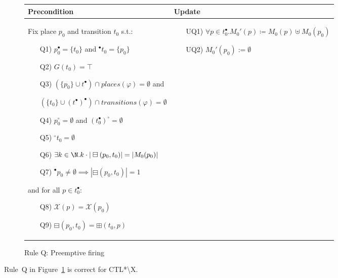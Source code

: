 \begin{figure}[h!]
    \vspace{5mm}

    \begin{adjustbox}{center}
        \begin{tabular}{|p{65mm}|p{60mm}|}
            \hline
            Precondition & Update \\ \hline
            Fix place $p_0$ and transition $t_0$ s.t.:
            \begin{itemize}[leftmargin=10mm]
                \item[Q1)] $p_0^\bullet = \{t_0\}$ and ${}^\bullet t_0 = \{p_0\}$
                \item[Q2)] $G(t_0) = \top$
                \item[Q3)] $(\{p_0\}\cup t^\bullet)\cap places(\varphi)=\emptyset$ and

                $(\{t_0\}\cup (t^\bullet)^\bullet)\cap transitions(\varphi)=\emptyset$

                \item[Q4)] $p_0^\circ=\emptyset$ and $(t_0^\bullet)^\circ=\emptyset$
                \item[Q5)] ${}^\circ t_0=\emptyset$
                \item[Q6)] $\exists k\in\N . k\cdot |\boxminus(p_0, t_0)| = |M_0(p_0)|$
                \item[Q7)] ${}^\bullet p_0\neq\emptyset\implies |\boxminus(p_0, t_0)|=1$
            \end{itemize}
            and for all $p\in t_0^\bullet$:
            \begin{itemize}[leftmargin=10mm]
                \item[Q8)] $\mathcal X(p) = \mathcal X(p_0) $
                \item[Q9)] $\boxminus(p_0, t_0) = \boxplus(t_0, p)$
            \end{itemize}
            &
            \begin{itemize}[leftmargin=10mm]
                \item[UQ1)] $\forall p \in t_0^\bullet . M_0'(p) \coloneqq M_0(p) \uplus M_0(p_0) $
                \item[UQ2)] $M_0'(p_0):=\emptyset$
            \end{itemize} \\ \hline
        \end{tabular}
    \end{adjustbox}
    \caption{Rule Q: Preemptive firing}
    \label{fig:rule_q_cpn}
\end{figure}

\begin{theorem}
    Rule~Q in Figure~\ref{fig:rule_q_cpn} is correct for CTL*\textbackslash X.
\end{theorem}
